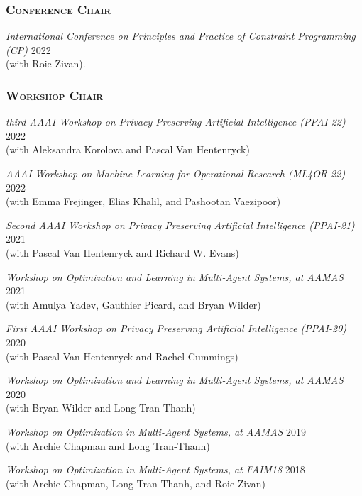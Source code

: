 

\subsubsection*{\scshape Conference Chair}{}{}{}  
\beginList    
    \item \emph{International Conference on Principles and Practice of Constraint Programming (CP)}  \hfill{2022} \\
      (with Roie Zivan).
\endList

\subsubsection*{\scshape Workshop Chair}{}{}{}
  \beginList
    \item 
    \emph{third AAAI Workshop on Privacy Preserving Artificial Intelligence (PPAI-22)}   \hfill{2022}
    \\(with Aleksandra Korolova and Pascal Van Hentenryck)
    \item 
    \emph{AAAI Workshop on Machine Learning for Operational Research (ML4OR-22)}   \hfill{2022}
    \\(with Emma Frejinger, Elias Khalil, and Pashootan Vaezipoor)
    \item 
    \emph{Second AAAI Workshop on Privacy Preserving Artificial Intelligence (PPAI-21)}   \hfill{2021}
    \\(with Pascal Van Hentenryck and Richard W. Evans)
    \item 
    \emph{Workshop on Optimization and Learning in Multi-Agent Systems, at AAMAS} \hfill{2021}
    \\(with Amulya Yadev, Gauthier Picard, and Bryan Wilder)
    \item 
    \emph{First AAAI Workshop on Privacy Preserving Artificial Intelligence (PPAI-20)}   \hfill{2020}
    \\(with Pascal Van Hentenryck and Rachel Cummings)
    \item 
    \emph{Workshop on Optimization and Learning in Multi-Agent Systems, at AAMAS} \hfill{2020}
    \\(with Bryan Wilder and Long Tran-Thanh)
    \item 
    \emph{Workshop on Optimization in Multi-Agent Systems, at AAMAS} \hfill{2019}
    \\(with Archie Chapman and Long Tran-Thanh)
    \item 
    \emph{Workshop on Optimization in Multi-Agent Systems, at FAIM18} \hfill{2018}
    \\(with Archie Chapman, Long Tran-Thanh, and Roie Zivan)
  \endList
  
